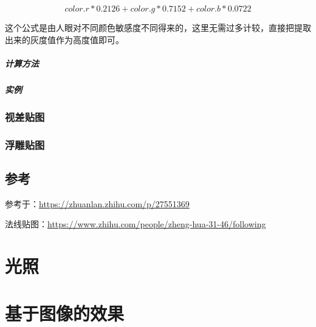 \documentclass[UTF8,a4paper,12pt]{ctexbook}
\begin{document}
				$$color.r * 0.2126 + color.g * 0.7152 + color.b * 0.0722$$
				
				这个公式是由人眼对不同颜色敏感度不同得来的，这里无需过多计较，直接把提取出来的灰度值作为高度值即可。
			\paragraph{计算方法}
			
			\paragraph{实例}
			
		\subsection{视差贴图}
		
		\subsection{浮雕贴图}
	
	\section{参考}
		参考于：\url{https://zhuanlan.zhihu.com/p/27551369}
		
		法线贴图：\url{https://www.zhihu.com/people/zheng-hua-31-46/following}
		
		
\chapter{光照}



\chapter{基于图像的效果}


	  
\end{document}

